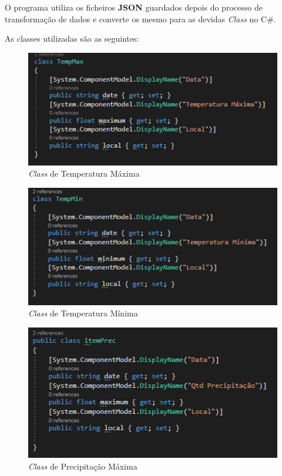 O programa utiliza os ficheiros \textbf{JSON} guardados depois do processo de transformação de dados e converte os mesmo para as devidas \textit{Class} no C\#.

As classes utilizadas são as seguintes:

\begin{figure}[H]
    \centering
    \includegraphics[scale=0.8]{imagens/TempMaxClass.png}
    \caption{\textit{Class} de Temperatura Máxima}
\end{figure}

\begin{figure}[H]
    \centering
    \includegraphics[scale=0.8]{imagens/TempMinClass.png}
    \caption{\textit{Class} de Temperatura Mínima}
\end{figure}

\begin{figure}[H]
    \centering
    \includegraphics[scale=0.8]{imagens/PrecMaxClass.png}
    \caption{\textit{Class} de Precipitação Máxima}
\end{figure}

